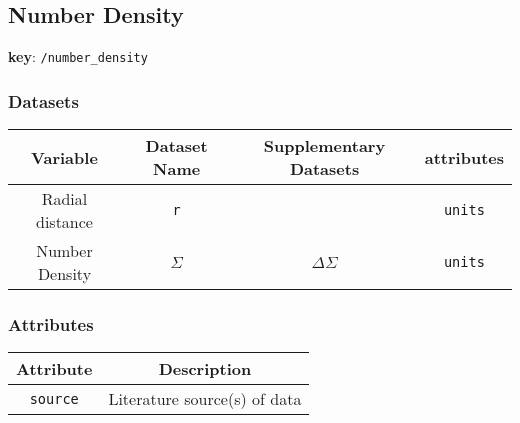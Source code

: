 \subsection{Number Density}

\textbf{key}: \texttt{/number\_density}

\subsubsection{Datasets}

\begin{center}
\begin{tabular}{ | c | c | c | c | }
    \hline
    Variable & Dataset Name & Supplementary Datasets &  attributes \\
    \hline\hline
    Radial distance & \texttt{r} & & \texttt{units} \\
    \hline
    Number Density & \texttt{\(\Sigma\)} & \texttt{\(\Delta\Sigma\)} & \texttt{units} \\
    \hline

\end{tabular}
\end{center}

\subsubsection{Attributes}


\begin{center}
\begin{tabular}{ | c | c | }
    \hline
    Attribute & Description \\
    \hline\hline
    \texttt{source} & Literature source(s) of data \\
    \hline
\end{tabular}
\end{center}
